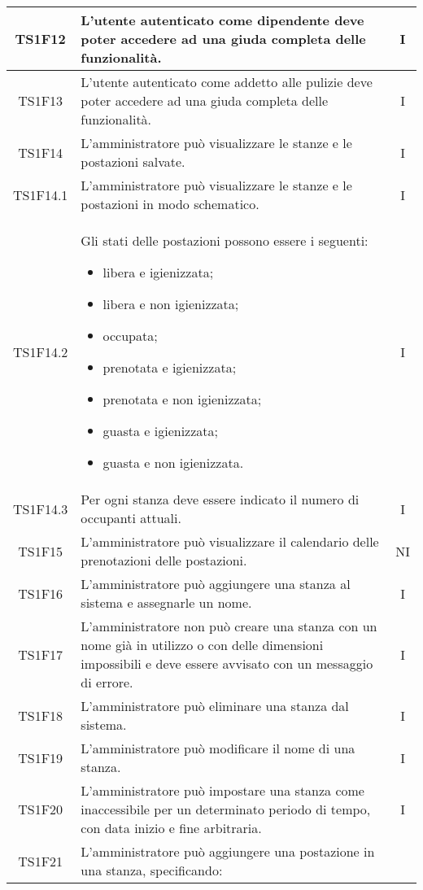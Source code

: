 \begin{center}
\begin{longtable}{|c|p{10cm}|c|}
			\hline
			TS1F12 & L'utente autenticato come dipendente deve poter accedere ad una giuda completa delle funzionalità. & I \\			
			\hline
			TS1F13 & L'utente autenticato come addetto alle pulizie deve poter accedere ad una giuda completa delle funzionalità. & I \\
			\hline
			TS1F14 & L'amministratore può visualizzare le stanze e le postazioni salvate. & I \\			
			\hline
			TS1F14.1 & L'amministratore può visualizzare le stanze e le postazioni in modo schematico. & I \\			
			\hline
			TS1F14.2 & Gli stati delle postazioni possono essere i seguenti:
			 \begin{itemize}
			 	\item libera e igienizzata;
			 	\item libera e non igienizzata;
			 	\item occupata;
			 	\item prenotata e igienizzata;
			 	\item prenotata e non igienizzata;
			 	\item guasta e igienizzata;
			 	\item guasta e non igienizzata.
			 \end{itemize}
			 & I \\			
			\hline
			TS1F14.3 & Per ogni stanza deve essere indicato il numero di occupanti attuali. & I \\			
			\hline
			TS1F15 & L'amministratore può visualizzare il calendario delle prenotazioni delle postazioni. & NI \\			
			\hline
			TS1F16 & L'amministratore può aggiungere una stanza al sistema e assegnarle un nome. & I \\			
			\hline
			TS1F17 & L'amministratore non può creare una stanza con un nome già in utilizzo o con delle dimensioni impossibili e deve essere avvisato con un messaggio di errore. & I \\			
			\hline
			TS1F18 & L'amministratore può eliminare una stanza dal sistema. & I \\			
			\hline
			TS1F19 & L'amministratore può modificare il nome di una stanza. & I \\			
			\hline
			TS1F20 & L'amministratore può impostare una stanza come inaccessibile per un determinato periodo di tempo, con data inizio e fine arbitraria. & I \\			
			\hline
			TS1F21 & L'amministratore può aggiungere una postazione in una stanza, specificando:

\end{longtable}
\end{center}
